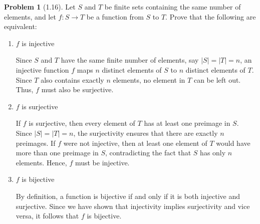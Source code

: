 \documentclass[12pt]{article}
\theoremstyle{definition}
\newtheorem{problem}{Problem}
\begin{document}
\begin{problem}[1.16]

    Let $S$ and $T$ be finite sets containing the same number of elements, and let $f: S \rightarrow T$
    be a function from $S$ to $T$. Prove that the following are equivalent:
    \begin{enumerate}[label=(\alph*)]
        \item $f$ is injective
        
        \begin{solution}
            Since \( S \) and \( T \) have the same finite number of elements, say \( |S| = |T| = n \), an injective function \( f \) maps \( n \) distinct elements of \( S \) to \( n \) distinct elements of \( T \). Since \( T \) also contains exactly \( n \) elements, no element in \( T \) can be left out. Thus, \( f \) must also be surjective.
        \end{solution}
        \item $f$ is surjective
        
        \begin{solution}
            If \( f \) is surjective, then every element of \( T \) has at least one preimage in \( S \). Since \( |S| = |T| = n \), the surjectivity ensures that there are exactly \( n \) preimages. If \( f \) were not injective, then at least one element of \( T \) would have more than one preimage in \( S \), contradicting the fact that \( S \) has only \( n \) elements. Hence, \( f \) must be injective.
        \end{solution}
        \item $f$ is bijective
        
        \begin{solution}
            By definition, a function is bijective if and only if it is both injective and surjective. Since we have shown that injectivity implies surjectivity and vice versa, it follows that \( f \) is bijective.
        \end{solution}
    \end{enumerate}
\end{problem}
\end{document}

